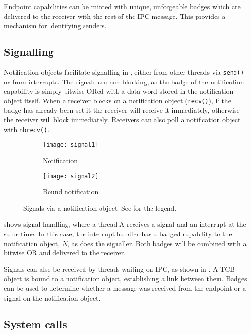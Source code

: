 Endpoint capabilities can be minted with unique, unforgeable badges which are delivered to the
receiver with the rest of the IPC message. This provides a mechanism for identifying senders.

\subsection{Signalling}

Notification objects facilitate signalling in \selfour, either from other threads via \texttt{send()} or from
interrupts. The signals are non-blocking, as the badge of the notification capability is simply
bitwise ORed with a data word stored in the notification object itself. When a receiver blocks on a
notification object (\texttt{recv()}), if the badge has already been set it the receiver will
receive it immediately, otherwise the receiver will block immediately. Receivers can also poll a
notification object with \texttt{nbrecv()}.

\begin{figure}
    \centering
    \begin{subfigure}[b]{0.49\textwidth}
        \centering
        \texttt{[image: signal1]}
        \caption{Notification}
        \label{f:signal1}
    \end{subfigure}%
    \begin{subfigure}[b]{0.49\textwidth}
        \centering
        \texttt{[image: signal2]}
        \caption{Bound notification}
        \label{f:signal2}
    \end{subfigure}
    \label{f:signal}
    \caption{Signals via a notification object. See  for the legend.}
\end{figure}


 shows signal handling, where a thread A receives a signal and an interrupt at the
same time. In this case, the interrupt handler has a badged capability to the notification object,
$N$, as does the signaller. Both badges will be combined with a bitwise OR and delivered to the
receiver.

Signals can also be received by threads waiting on \gls{IPC}, as shown in . A
\gls{TCB} object is bound to a notification object, establishing a link between them. Badges can be
used to determine whether a message was received from the endpoint or a signal on the notification object.

\subsection{System calls}


